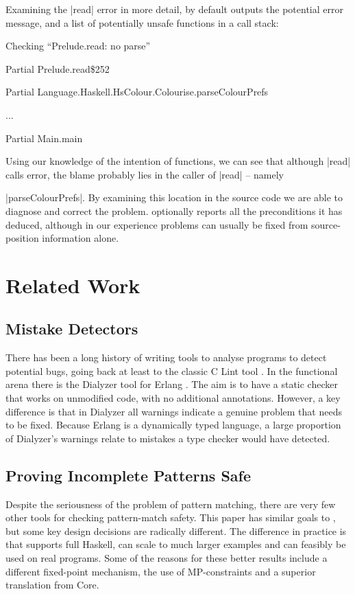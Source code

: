 Examining the |read| error in more detail, by default \catch{} outputs the potential error message, and a list of potentially unsafe functions in a call stack:

\smallskip
\par\noindent\textsf{Checking ``Prelude.read: no parse''}
\par\noindent\textsf{Partial Prelude.read\$252}
\par\noindent\textsf{Partial Language.Haskell.HsColour.Colourise.parseColourPrefs}
\par\noindent\textsf{...}
\par\noindent\textsf{Partial Main.main}
\smallskip

Using our knowledge of the intention of functions, we can see that although |read| calls error, the blame probably lies in the caller of |read| -- namely \ignore|parseColourPrefs|. By examining this location in the source code we are able to diagnose and correct the problem. \catch{} optionally reports all the preconditions it has deduced, although in our experience problems can usually be fixed from source-position information alone.

\section{Related Work}
\label{sec:related}

\subsection{Mistake Detectors}

There has been a long history of writing tools to analyse programs to detect potential bugs, going back at least to the classic C Lint tool \citep{lint}. In the functional arena there is the Dialyzer tool \citep{dialyzer} for Erlang \citep{erlang}. The aim is to have a static checker that works on unmodified code, with no additional annotations. However, a key difference is that in Dialyzer all warnings indicate a genuine problem that needs to be fixed. Because Erlang is a dynamically typed language, a large proportion of Dialyzer's warnings relate to mistakes a type checker would have detected.

\subsection{Proving Incomplete Patterns Safe}

Despite the seriousness of the problem of pattern matching, there are very few other tools for checking pattern-match safety. This paper has similar goals to \citet{me:catch_tfp}, but some key design decisions are radically different. The difference in practice is that  supports full Haskell, can scale to much larger examples and can feasibly be used on real programs. Some of the reasons for these better results include a different fixed-point mechanism, the use of MP-constraints and a superior translation from Core.

